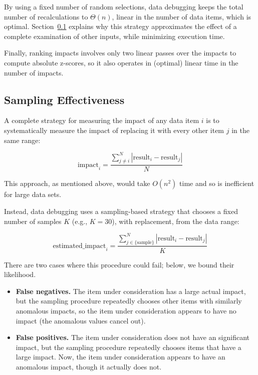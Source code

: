 By using a fixed number of random selections, data debugging keeps the
total number of recalculations to $\Theta(n)$, linear in the number of
data items, which is optimal. Section~\ref{sec:sampling_effectiveness}
explains why this strategy approximates the effect of a complete
examination of other inputs, while minimizing execution time.

Finally, ranking impacts involves only two linear passes over the
impacts to compute absolute z-scores, so it also operates in (optimal)
linear time in the number of impacts.

\subsection{Sampling Effectiveness}
\label{sec:sampling_effectiveness}

A complete strategy for measuring the impact of any data item $i$ is to
systematically measure the impact of replacing it with every other
item $j$ in the same range:

\begin{equation}
\mbox{impact}_i = \frac{\sum_{j \neq i}^{N}{|\mbox{result}_i-\mbox{result}_j|}}{N}
\end{equation}

\noindent
This approach, as mentioned above, would take $O(n^2)$ time and so is
inefficient for large data sets.

Instead, data debugging uses a sampling-based strategy that chooses a
fixed number of samples $K$ (e.g., $K = 30$), with replacement, from
the data range:

\begin{equation}
\mbox{estimated\_impact}_i = \frac{\sum_{j \in \{\mbox{sample}\}}^{N}{|\mbox{result}_i-\mbox{result}_j|}}{K}
\end{equation}

\noindent
There are two cases where this procedure could fail; below, we bound their likelihood.

\begin{itemize}
\item \textbf{False negatives.} The item under consideration has a
  large actual impact, but the sampling procedure repeatedly
  chooses other items with similarly anomalous impacts, so the item under
  consideration appears to have no impact (the anomalous values cancel out).
\item \textbf{False positives.} The item under consideration does
  not have an significant impact, but the sampling procedure
  repeatedly chooses items that have a large impact. Now, the item
  under consideration appears to have an anomalous impact, though it actually does not.
\end{itemize}

